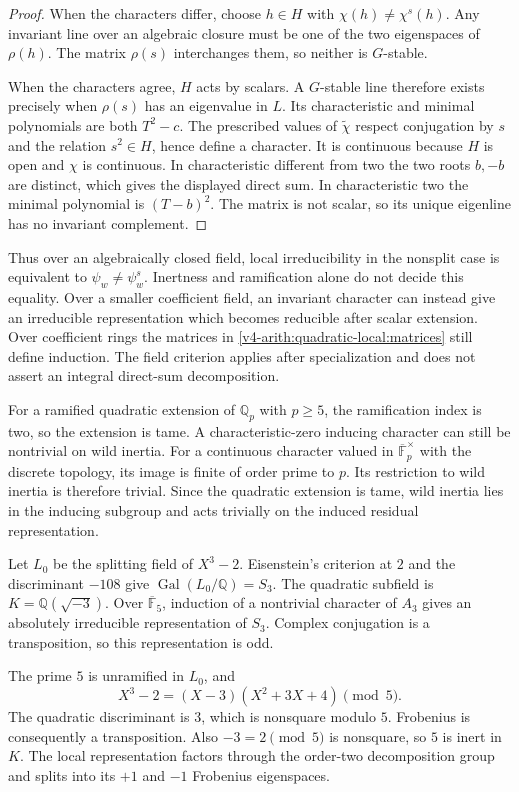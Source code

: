 \begin{proof}
When the characters differ, choose $h\in H$ with
$\chi(h)\ne\chi^s(h)$. Any invariant line over an algebraic closure
must be one of the two eigenspaces of $\rho(h)$. The matrix $\rho(s)$
interchanges them, so neither is $G$-stable.

When the characters agree, $H$ acts by scalars. A $G$-stable line
therefore exists precisely when $\rho(s)$ has an eigenvalue in $L$.
Its characteristic and minimal polynomials are both $T^2-c$.
The prescribed values of $\widetilde\chi$ respect conjugation by $s$
and the relation $s^2\in H$, hence define a character.
It is continuous because $H$ is open and $\chi$ is continuous.
In characteristic different from two the two roots $b,-b$ are distinct,
which gives the displayed direct sum. In characteristic two the
minimal polynomial is $(T-b)^2$. The matrix is not scalar, so its
unique eigenline has no invariant complement.
\end{proof}

Thus over an algebraically closed field, local irreducibility in the
nonsplit case is equivalent to $\psi_w\ne\psi_w^s$. Inertness and
ramification alone do not decide this equality. Over a smaller
coefficient field, an invariant character can instead give an
irreducible representation which becomes reducible after scalar extension.
Over coefficient rings the matrices in
\eqref{v4-arith:quadratic-local:matrices} still define induction.
The field criterion applies after specialization and does not assert
an integral direct-sum decomposition.

For a ramified quadratic extension of $\mathbb Q_p$ with $p\ge5$,
the ramification index is two, so the extension is tame.
A characteristic-zero inducing character can still be nontrivial on
wild inertia. For a continuous character valued in
$\overline{\mathbb F}_p^\times$ with the discrete topology, its image
is finite of order prime to $p$. Its restriction to wild inertia is
therefore trivial. Since the quadratic extension is tame, wild inertia
lies in the inducing subgroup and acts trivially on the induced
residual representation.

\begin{example}
Let $L_0$ be the splitting field of $X^3-2$. Eisenstein's criterion at
$2$ and the discriminant $-108$ give
$\operatorname{Gal}(L_0/\mathbb Q)=S_3$. The quadratic subfield is
$K=\mathbb Q(\sqrt{-3})$. Over $\overline{\mathbb F}_5$, induction
of a nontrivial character of $A_3$ gives an absolutely irreducible
representation of $S_3$. Complex conjugation is a transposition,
so this representation is odd.

The prime $5$ is unramified in $L_0$, and
\[
 X^3-2=(X-3)(X^2+3X+4)\pmod5.
\]
The quadratic discriminant is $3$, which is nonsquare modulo $5$.
Frobenius is consequently a transposition. Also $-3=2\pmod5$ is
nonsquare, so $5$ is inert in $K$. The local representation factors
through the order-two decomposition group and splits into its
$+1$ and $-1$ Frobenius eigenspaces.
\end{example}


